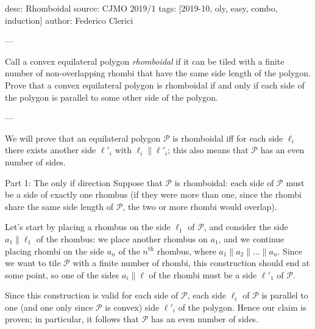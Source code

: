 desc: Rhomboidal
source: CJMO 2019/1
tags: [2019-10, oly, easy, combo, induction]
author: Federico Clerici

---

Call a convex equilateral polygon \emph{rhomboidal} if it can be tiled with a finite number of non-overlapping rhombi that have the same side length of the polygon. Prove that a convex equilateral polygon is rhomboidal if and only if each side of the polygon is parallel to some other side of the polygon.

---

We will prove that an equilateral polygon $\mathcal{P}$ is rhomboidal iff for each side $\ell_i$ there exists another side $\ell'_i$ with $\ell_i \parallel \ell'_i$; this also means that $\mathcal{P}$ has an even number of sides.
\begin{customenv}{Part 1: The only if direction}
    Suppose that $\mathcal{P}$ is rhomboidal: each side of $\mathcal{P}$ must be a side of exactly one rhombus (if they were more than one, since the rhombi share the same side length of $\mathcal{P}$, the two or more rhombi would overlap).

    Let's start by placing a rhombus on the side $\ell_1$ of $\mathcal{P}$, and consider the side $a_1\parallel \ell_1$ of the rhombus: we place another rhombus on $a_1$, and we continue placing rhombi on the side $a_{n}$ of the $n^{\text{th}}$ rhombus, where $a_1\parallel a_2\parallel ...\parallel a_n$. Since we want to tile $\mathcal{P}$ with a finite number of rhombi, this construction should end at some point, so one of the sides $a_i\parallel \ell$ of the rhombi must be a side $\ell'_1$ of $\mathcal{P}$.

    Since this construction is valid for each side of $\mathcal{P}$, each side $\ell_i$ of $\mathcal{P}$ is parallel to one (and one only since $\mathcal{P}$ is convex) side $\ell'_i$ of the polygon. Hence our claim is proven; in particular, it follows that $\mathcal{P}$ has an even number of sides.
\end{customenv}

